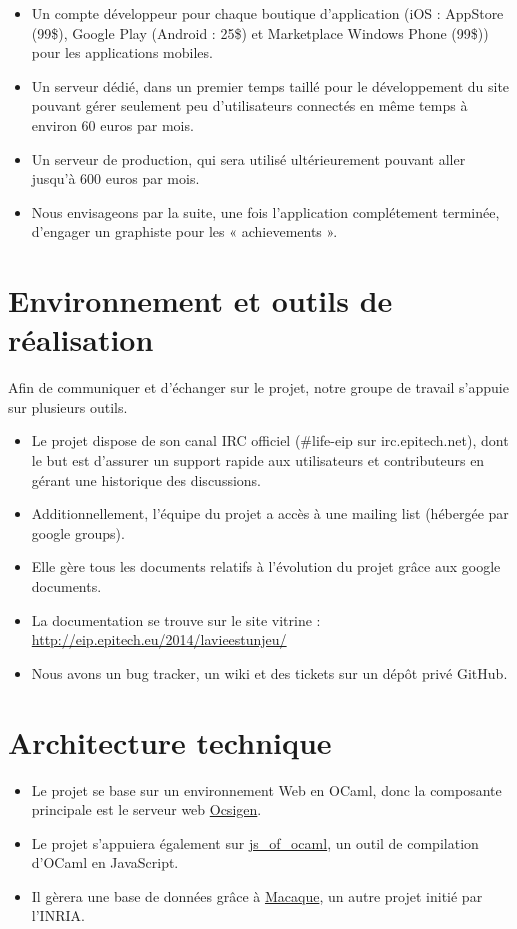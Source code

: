 \documentclass{life-fr}
\begin{document}
\begin{itemize}
  \item Un compte développeur pour chaque boutique d'application (iOS : AppStore (99\$), Google Play (Android : 25\$) et Marketplace Windows Phone (99\$)) pour les applications mobiles.
  \item Un serveur dédié, dans un premier temps taillé pour le développement du site pouvant gérer seulement peu d'utilisateurs connectés en même temps à environ 60 euros par mois.
  \item Un serveur de production, qui sera utilisé ultérieurement pouvant aller jusqu'à 600 euros par mois.
  \item Nous envisageons par la suite, une fois l'application complétement terminée, d'engager un graphiste pour les « achievements ».
\end{itemize}

\section{Environnement et outils de réalisation}

Afin de communiquer et d’échanger sur le projet, notre groupe de travail s’appuie sur plusieurs outils.

\begin{itemize}
  \item Le projet dispose de son canal IRC officiel (\#life-eip sur irc.epitech.net), dont le but est d’assurer un support rapide aux utilisateurs et contributeurs en gérant une historique des discussions.
  \item Additionnellement, l’équipe du projet a accès à une mailing list (hébergée par google groups).
  \item Elle gère tous les documents relatifs à l’évolution du projet grâce aux google documents.
  \item La documentation se trouve sur le site vitrine : \url{http://eip.epitech.eu/2014/lavieestunjeu/}
  \item Nous avons un bug tracker, un wiki et des tickets sur un dépôt privé GitHub.
\end{itemize}

\section{Architecture technique}

\begin{itemize}
  \item Le projet se base sur un environnement Web en OCaml, donc la composante principale est le serveur web \href{http://ocsigen.org/}{Ocsigen}.
  \item Le projet s’appuiera également sur \href{http://ocsigen.org/js_of_ocaml/}{js\_of\_ocaml}, un outil de compilation d’OCaml en JavaScript.
  \item Il gèrera une base de données grâce à \href{http://ocsigen.org/macaque/}{Macaque}, un autre projet initié par l’INRIA.
\end{itemize}
\end{document}
